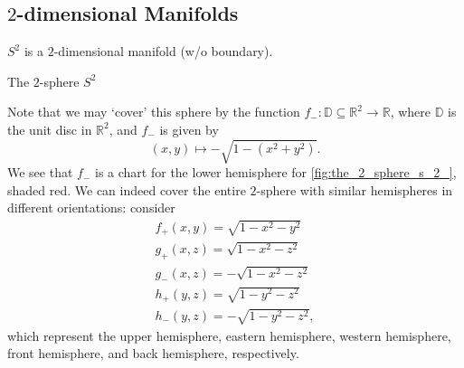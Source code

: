 \documentclass[notoc,notitlepage]{tufte-book}
\begin{document}
\subsection{\texorpdfstring{$2$}{2}-dimensional Manifolds}%
\label{sub:_2_dimensional_manifolds}

\begin{eg}\label{eg:2_sphere_as_a_manifold}
  $S^2$ is a $2$-dimensional manifold (w/o boundary).
  \begin{marginfigure}
    \centering
    \caption{The $2$-sphere $S^2$}
    \label{fig:the_2_sphere_s_2_}
  \end{marginfigure}
  Note that we may `cover' this sphere by the function $f_{-} : \mathbb{D} \subseteq \mathbb{R}^2 \to \mathbb{R}$,
  where $\mathbb{D}$ is the unit disc in $\mathbb{R}^2$, and $f_{-}$ is given by
  \begin{equation*}
    (x, y) \mapsto - \sqrt{1 - (x^2 + y^2)}.
  \end{equation*}
  We see that $f_{-}$ is a chart for the lower hemisphere for \cref{fig:the_2_sphere_s_2_}, shaded red.
  We can indeed cover the entire $2$-sphere with similar hemispheres in different orientations: consider
  \begin{gather*}
    f_+ (x, y) = \sqrt{ 1 - x^2 - y^2 } \\
    g_+ (x, z) = \sqrt{ 1 - x^2 - z^2 } \\
    g_- (x, z) = - \sqrt{ 1 - x^2 - z^2 } \\
    h_+ (y, z) = \sqrt{ 1 - y^2 - z^2 } \\
    h_- (y, z) = - \sqrt{ 1 - y^2 - z^2 },
  \end{gather*}
  which represent the upper hemisphere, eastern hemisphere, western hemisphere, front hemisphere,
  and back hemisphere, respectively.
\end{eg}
\end{document}
